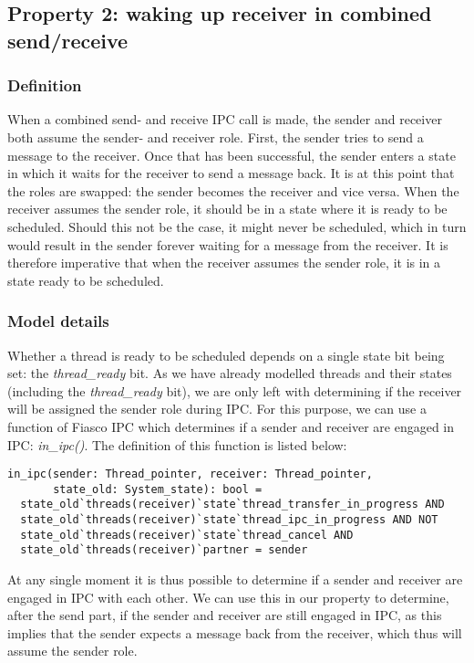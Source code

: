 \subsection{Property 2: waking up receiver in combined send/receive}

\subsubsection{Definition}
When a combined send- and receive IPC call is made, the sender and receiver both assume the sender- and receiver role. First, the sender tries to send a message to the receiver. Once that has been successful, the sender enters a state in which it waits for the receiver to send a message back. It is at this point that the roles are swapped: the sender becomes the receiver and vice versa. When the receiver assumes the sender role, it should be in a state where it is ready to be scheduled. Should this not be the case, it might never be scheduled, which in turn would result in the sender forever waiting for a message from the receiver. It is therefore imperative that when the receiver assumes the sender role, it is in a state ready to be scheduled.

\subsubsection{Model details}
Whether a thread is ready to be scheduled depends on a single state bit being set: the \emph{thread\_ready} bit. As we have already modelled threads and their states (including the \emph{thread\_ready} bit), we are only left with determining if the receiver will be assigned the sender role during IPC. For this purpose, we can use a function of Fiasco IPC which determines if a sender and receiver are engaged in IPC: \emph{in\_ipc()}. The definition of this function is listed below:

\lstset{language=PVS}
\begin{lstlisting}[caption={PVS: \emph{in\_ipc()} definition.}]
% Indicates if the receiver is engaged in IPC with the sender.
in_ipc(sender: Thread_pointer, receiver: Thread_pointer, 
       state_old: System_state): bool =
  state_old`threads(receiver)`state`thread_transfer_in_progress AND
  state_old`threads(receiver)`state`thread_ipc_in_progress AND NOT
  state_old`threads(receiver)`state`thread_cancel AND 
  state_old`threads(receiver)`partner = sender
\end{lstlisting}

At any single moment it is thus possible to determine if a sender and receiver are engaged in IPC with each other. We can use this in our property to determine, after the send part, if the sender and receiver are still engaged in IPC, as this implies that the sender expects a message back from the receiver, which thus will assume the sender role.


